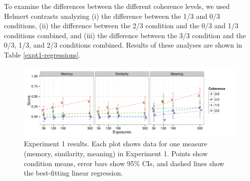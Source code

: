 \documentclass[man,floatsintext]{apa6}
\begin{document}
To examine the differences between the different coherence levels, we used Helmert contrasts analyzing (i) the difference between the 1/3 and 0/3 conditions, (ii) the difference between the 2/3 condition and the 0/3 and 1/3 conditions combined, and (iii) the difference between the 3/3 condition and the 0/3, 1/3, and 2/3 conditions combined. Results of these analyses are shown in Table \ref{expt1-regressions}.

\begin{figure}[h]
  \begin{center}
    \includegraphics[width=1.0\linewidth]{x1.pdf}
    \caption{Experiment 1 results. Each plot shows data for one measure (memory, similarity, meaning) in Experiment 1. Points show condition means, error bars show 95\% CIs, and dashed lines show the best-fitting linear regression.}
    \label{expt1-results}
  \end{center}
\end{figure}

\newcommand{\ww}{\color{white}{*}}
\newcommand\T{\rule{0pt}{2.1ex}}
\end{document}
